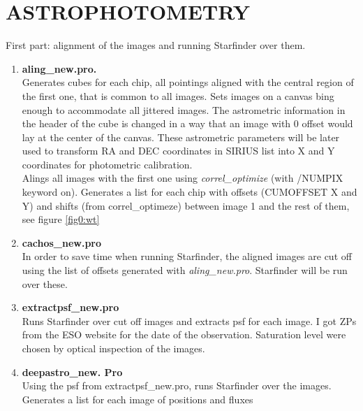 \documentclass[4paper,11pt]{report}
\begin{document}
	\section*{ASTROPHOTOMETRY}
First part: alignment of the images and running Starfinder over them.
\begin{enumerate}
	\item \textbf{aling\_new.pro.} \\
	Generates cubes for each chip, all pointings aligned with the central region of the first one, that is common  to all images.
	Sets images on a canvas bing enough to accommodate all jittered images. The astrometric information in the header of the cube is changed in a way that an image with 0 offset would lay at the center of the canvas. These astrometric parameters will be later used to transform RA and DEC coordinates in SIRIUS list into X and Y coordinates for photometric calibration.\\
	Alings all images with the first one using \textit{correl\_optimize} (with /NUMPIX keyword on). Generates a list for each chip with offsets (CUMOFFSET X and Y) and shifts (from correl\_optimeze) between image 1 and the rest of them, see figure \ref{fig0:wt}
	\item \textbf{cachos\_new.pro } \\
	In order to save time when running Starfinder, the aligned images are cut off using the list of offsets generated with \textit{aling\_new.pro}. Starfinder will be run over these.
	\item \textbf{extractpsf\_new.pro} \\
	Runs Starfinder over cut off images and extracts psf for each image. I got ZPs from the ESO website for the date of the observation. Saturation level were chosen by optical inspection of the images.
	\item \textbf{deepastro\_new. Pro} \\
     Using the psf from extractpsf\_new.pro, runs Starfinder over the images. Generates a list for each image of positions and fluxes

\end{enumerate}
\end{document}
